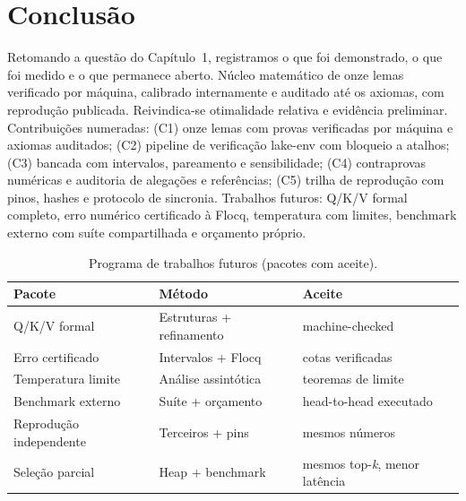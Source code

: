 \chapter{Conclusão}
Retomando a questão do Capítulo~1, registramos o que foi demonstrado, o que foi medido e o que permanece aberto.
Núcleo matemático de onze lemas verificado por máquina, calibrado internamente e auditado até os axiomas, com reprodução publicada. Reivindica-se otimalidade relativa e evidência preliminar. Contribuições numeradas: (C1) onze lemas com provas verificadas por máquina e axiomas auditados; (C2) pipeline de verificação lake-env com bloqueio a atalhos; (C3) bancada com intervalos, pareamento e sensibilidade; (C4) contraprovas numéricas e auditoria de alegações e referências; (C5) trilha de reprodução com pinos, hashes e protocolo de sincronia. Trabalhos futuros: Q/K/V formal completo, erro numérico certificado à Flocq, temperatura com limites, benchmark externo com suíte compartilhada e orçamento próprio.
\begin{table}[h]
\centering
\caption{Programa de trabalhos futuros (pacotes com aceite).}
\label{tab:futuro}
\begin{tabular}{lll}
\toprule
Pacote & Método & Aceite \\
\midrule
Q/K/V formal & Estruturas + refinamento & machine-checked \\
Erro certificado & Intervalos + Flocq & cotas verificadas \\
Temperatura limite & Análise assintótica & teoremas de limite \\
Benchmark externo & Suíte + orçamento & head-to-head executado \\
Reprodução independente & Terceiros + pins & mesmos números \\
Seleção parcial & Heap + benchmark & mesmos top-\textit{k}, menor latência \\
\bottomrule
\end{tabular}
\end{table}
